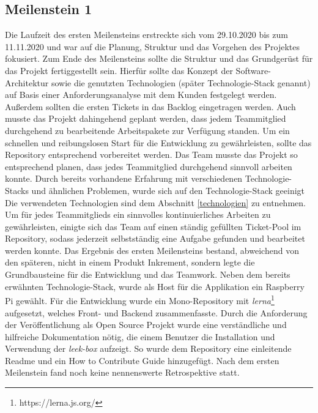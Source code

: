 \documentclass[10pt, a4paper]{article}
\begin{document}
\begin{onehalfspace}
\subsection{Meilenstein 1}
Die Laufzeit des ersten Meilensteins erstreckte sich vom 29.10.2020 bis zum 11.11.2020 und war auf die Planung, Struktur und das Vorgehen des Projektes fokusiert.
Zum Ende des Meilensteins sollte die Struktur und das Grundgerüst für das Projekt fertiggestellt sein.
Hierfür sollte das Konzept der Software-Architektur sowie die genutzten Technologien (später Technologie-Stack genannt) auf Basis einer Anforderungsanalyse mit dem Kunden festgelegt werden.
Außerdem sollten die ersten Tickets in das Backlog eingetragen werden.
Auch musste das Projekt dahingehend geplant werden, dass jedem Teammitglied durchgehend zu bearbeitende Arbeitspakete zur Verfügung standen.
Um ein schnellen und reibungslosen Start für die Entwicklung zu gewährleisten, sollte das Repository entsprechend vorbereitet werden.
Das Team musste das Projekt so entsprechend planen, dass jedes Teammitglied durchgehend sinnvoll arbeiten konnte.
Durch bereits vorhandene Erfahrung mit verschiedenen Technologie-Stacks und ähnlichen Problemen, wurde sich auf den Technologie-Stack geeinigt
Die verwendeten Technologien sind dem Abschnitt \ref{technologien} zu entnehmen.
Um für jedes Teammitglieds ein sinnvolles kontinuierliches Arbeiten zu gewährleisten, einigte sich das Team auf einen ständig gefüllten Ticket-Pool im Repository, sodass jederzeit selbstständig eine Aufgabe gefunden und bearbeitet werden konnte.
Das Ergebnis des ersten Meilensteins bestand, abweichend von den späteren, nicht in einem Produkt Inkrement, sondern legte die Grundbausteine für die Entwicklung und das Teamwork.
Neben dem bereits erwähnten Technologie-Stack, wurde als Host für die Applikation ein Raspberry Pi gewählt.
Für die Entwicklung wurde ein Mono-Repository mit \textit{lerna}\footnote{https://lerna.js.org/} aufgesetzt, welches Front- und Backend zusammenfasste.
Durch die Anforderung der Veröffentlichung als Open Source Projekt wurde eine verständliche und hilfreiche Dokumentation nötig, die einem Benutzer die Installation und Verwendung der \textit{leek-box} aufzeigt.
So wurde dem Repository eine einleitende Readme und ein \glqq How to Contribute\grqq{} Guide hinzugefügt.
Nach dem ersten Meilenstein fand noch keine nennenswerte Retrospektive statt.


\end{onehalfspace}
\end{document}

